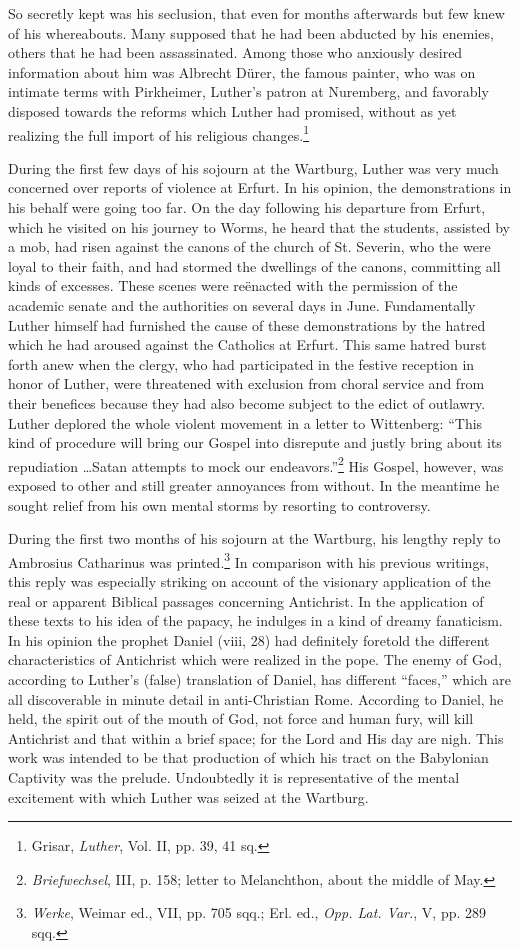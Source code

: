 So secretly kept was his seclusion, that even for months afterwards
but few knew of his whereabouts. Many supposed that he had been
abducted by his enemies, others that he had been assassinated. Among
those who anxiously desired information about him was Albrecht
Dürer, the famous painter, who was on intimate terms with Pirkheimer,
Luther’s patron at Nuremberg, and favorably disposed
towards the reforms which Luther had promised, without as yet
realizing the full import of his religious changes.\footnote{Grisar, \textit{Luther}, Vol. II, pp. 39, 41 sq.}

During the first few days of his sojourn at the Wartburg, Luther
was very much concerned over reports of violence at Erfurt. In
his opinion, the demonstrations in his behalf were going too far. On
the day following his departure from Erfurt, which he visited on
his journey to Worms, he heard that the students, assisted by a mob,
had risen against the canons of the church of St. Severin, who
the were loyal to their faith, and had stormed the dwellings of the
canons, committing all kinds of excesses. These scenes were reënacted
with the permission of the academic senate and the authorities on
several days in June. Fundamentally Luther himself had furnished
the cause of these demonstrations by the hatred which he had
aroused against the Catholics at Erfurt. This same hatred burst
forth anew when the clergy, who had participated in the festive
reception in honor of Luther, were threatened with exclusion from
choral service and from their benefices because they had also become
subject to the edict of outlawry. Luther deplored the whole violent
movement in a letter to Wittenberg: “This kind of procedure will
bring our Gospel into disrepute and justly bring about its repudiation
\dots Satan attempts to mock our endeavors.”\footnote{\textit{Briefwechsel}, III, p. 158; letter to Melanchthon, about the middle of May.}
His Gospel,
however, was exposed to other and still greater annoyances from
without. In the meantime he sought relief from his own mental
storms by resorting to controversy.

During the first two months of his sojourn at the Wartburg, his
lengthy reply to Ambrosius Catharinus was printed.\footnote{\textit{Werke}, Weimar ed., VII, pp. 705 sqq.; Erl. ed., \textit{Opp. Lat. Var.}, V, pp. 289 sqq.}
In comparison
with his previous writings, this reply was especially striking on account
of the visionary application of the real or apparent Biblical
passages concerning Antichrist. In the application of these texts
to his idea of the papacy, he indulges in a kind of dreamy fanaticism.
In his opinion the prophet Daniel (viii, 28) had definitely foretold
the different characteristics of Antichrist which were realized in
the pope. The enemy of God, according to Luther’s (false) translation of
Daniel, has different “faces,” which are all discoverable in
minute detail in anti-Christian Rome. According to Daniel, he held,
the spirit out of the mouth of God, not force and human fury, will
kill Antichrist and that within a brief space; for the Lord and
His day are nigh. This work was intended to be that production of
which his tract on the Babylonian Captivity was the prelude. Undoubtedly
it is representative of the mental excitement with which
Luther was seized at the Wartburg.

